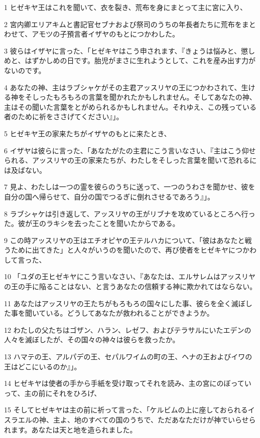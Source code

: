 \par 1 ヒゼキヤ王はこれを聞いて、衣を裂き、荒布を身にまとって主に宮に入り、
\par 2 宮内卿エリアキムと書記官セブナおよび祭司のうちの年長者たちに荒布をまとわせて、アモツの子預言者イザヤのもとにつかわした。
\par 3 彼らはイザヤに言った、「ヒゼキヤはこう申されます、『きょうは悩みと、懲しめと、はずかしめの日です。胎児がまさに生れようとして、これを産み出す力がないのです。
\par 4 あなたの神、主はラブシャケがその主君アッスリヤの王につかわされて、生ける神をそしったもろもろの言葉を聞かれたかもしれません。そしてあなたの神、主はその聞いた言葉をとがめられるかもしれません。それゆえ、この残っている者のために祈をささげてください』」。
\par 5 ヒゼキヤ王の家来たちがイザヤのもとに来たとき、
\par 6 イザヤは彼らに言った、「あなたがたの主君にこう言いなさい、『主はこう仰せられる、アッスリヤの王の家来たちが、わたしをそしった言葉を聞いて恐れるには及ばない。
\par 7 見よ、わたしは一つの霊を彼らのうちに送って、一つのうわさを聞かせ、彼を自分の国へ帰らせて、自分の国でつるぎに倒れさせるであろう』」。
\par 8 ラブシャケは引き返して、アッスリヤの王がリブナを攻めているところへ行った。彼が王のラキシを去ったことを聞いたからである。
\par 9 この時アッスリヤの王はエチオピヤの王テルハカについて、「彼はあなたと戦うために出てきた」と人々がいうのを聞いたので、再び使者をヒゼキヤにつかわして言った、
\par 10 「ユダの王ヒゼキヤにこう言いなさい、『あなたは、エルサレムはアッスリヤの王の手に陥ることはない、と言うあなたの信頼する神に欺かれてはならない。
\par 11 あなたはアッスリヤの王たちがもろもろの国々にした事、彼らを全く滅ぼした事を聞いている。どうしてあなたが救われることができようか。
\par 12 わたしの父たちはゴザン、ハラン、レゼフ、およびテラサルにいたエデンの人々を滅ぼしたが、その国々の神々は彼らを救ったか。
\par 13 ハマテの王、アルパデの王、セパルワイムの町の王、ヘナの王およびイワの王はどこにいるのか』」。
\par 14 ヒゼキヤは使者の手から手紙を受け取ってそれを読み、主の宮にのぼっていって、主の前にそれをひろげ、
\par 15 そしてヒゼキヤは主の前に祈って言った、「ケルビムの上に座しておられるイスラエルの神、主よ、地のすべての国のうちで、ただあなただけが神でいらせられます。あなたは天と地を造られました。
